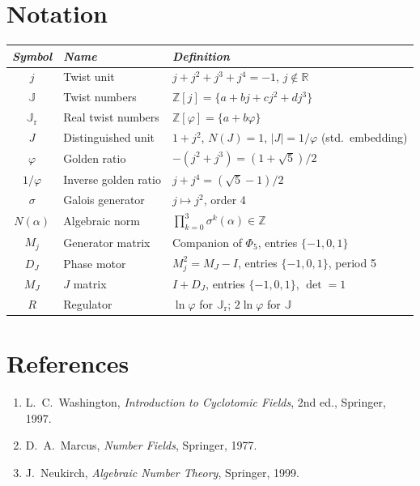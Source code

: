 \documentclass[11pt, a4paper]{article}
\newcommand{\ph}{\varphi}
\newcommand{\TT}{\mathbb{J}}
\newcommand{\TTr}{\mathbb{J}_{\mathrm{r}}}
\begin{document}
\section*{Notation}

\renewcommand{\arraystretch}{1.4}
\begin{tabularx}{\textwidth}{c l L}
\toprule
\textit{Symbol} & \textit{Name} & \textit{Definition} \\
\midrule
$j$ & Twist unit & $j + j^2 + j^3 + j^4 = -1$,\; $j \notin \mathbb{R}$ \\[0.3em]
$\TT$ & Twist numbers & $\mathbb{Z}[j] = \{a + bj + cj^2 + dj^3\}$ \\[0.3em]
$\TTr$ & Real twist numbers & $\mathbb{Z}[\ph] = \{a + b\ph\}$ \\[0.3em]
$J$ & Distinguished unit & $1 + j^2$,\; $N(J) = 1$,\; $|J| = 1/\ph$ (std.\ embedding) \\[0.3em]
$\ph$ & Golden ratio & $-(j^2 + j^3) = (1+\sqrt{5})/2$ \\[0.3em]
$1/\ph$ & Inverse golden ratio & $j + j^4 = (\sqrt{5}-1)/2$ \\[0.3em]
$\sigma$ & Galois generator & $j \mapsto j^2$,\; order 4 \\[0.3em]
$N(\alpha)$ & Algebraic norm & $\prod_{k=0}^{3} \sigma^k(\alpha) \in \mathbb{Z}$ \\[0.3em]
$M_j$ & Generator matrix & Companion of $\Phi_5$,\; entries $\{-1,0,1\}$ \\[0.3em]
$D_J$ & Phase motor & $M_j^2 = M_J - I$,\; entries $\{-1,0,1\}$,\; period 5 \\[0.3em]
$M_J$ & $J$ matrix & $I + D_J$,\; entries $\{-1,0,1\}$,\; $\det = 1$ \\[0.3em]
$R$ & Regulator & $\ln\ph$ for $\TTr$;\; $2\ln\ph$ for $\TT$ \\
\bottomrule
\end{tabularx}

\newpage

\section*{References}

\begin{enumerate}[leftmargin=2em,itemsep=0.1em]
\item L.\ C.\ Washington, \textit{Introduction to Cyclotomic Fields}, 2nd ed., Springer, 1997.
\item D.\ A.\ Marcus, \textit{Number Fields}, Springer, 1977.
\item J.\ Neukirch, \textit{Algebraic Number Theory}, Springer, 1999.
\end{enumerate}
\end{document}
